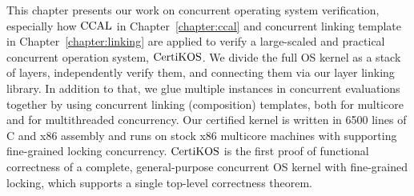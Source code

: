 

This chapter presents our work on concurrent operating system verification, especially 
how $\mathrm{CCAL}$ in Chapter~\ref{chapter:ccal} and concurrent linking template in Chapter~\ref{chapter:linking} are applied 
to verify a large-scaled and practical concurrent operation system, $\mathrm{CertiKOS}$.
We divide the full OS kernel as a stack of layers, independently verify them, 
and connecting them via our layer linking library. 
In addition to that, 
we glue multiple instances in concurrent evaluations together by using concurrent linking (composition) templates, both for multicore and for multithreaded concurrency.  
Our certified kernel is written in 6500 lines of C and x86 assembly
and runs on stock x86 multicore machines with supporting fine-grained locking concurrency. 
$\mathrm{CertiKOS}$ is the first proof of functional correctness of a complete,
general-purpose concurrent OS kernel with fine-grained locking,
which supports a single top-level correctness theorem. 

